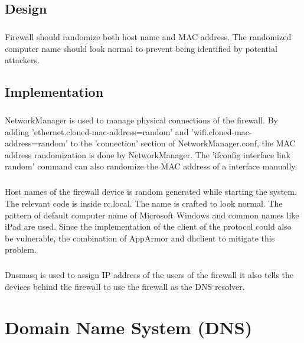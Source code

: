 \documentclass[mscthesis]{usiinfthesis}
\begin{document}
\section{Design}
\paragraph{}
Firewall should randomize both host name and MAC address. The randomized computer name should look normal to prevent being identified by potential attackers.


\section{Implementation}
\paragraph{}
NetworkManager is used to manage physical connections of the firewall. By adding 'ethernet.cloned-mac-address=random' and 'wifi.cloned-mac-address=random' to the 'connection' section of NetworkManager.conf, the MAC address randomization is done by NetworkManager. The 'ifconfig interface link random' command can also randomize the MAC address of a interface manually.
\paragraph{}
Host names of the firewall device is random generated while starting the system. The relevant code is inside rc.local. The name is crafted to look normal. The pattern of default computer name of Microsoft Windows and common names like iPad are used. Since the implementation of the client of the protocol could also be vulnerable, the combination of AppArmor and dhclient to mitigate this problem.
\paragraph{}
Dnsmasq is used to assign IP address of the users of the firewall it also tells the devices behind the firewall to use the firewall as the DNS resolver.

\chapter{Domain Name System (DNS)}
\end{document}
